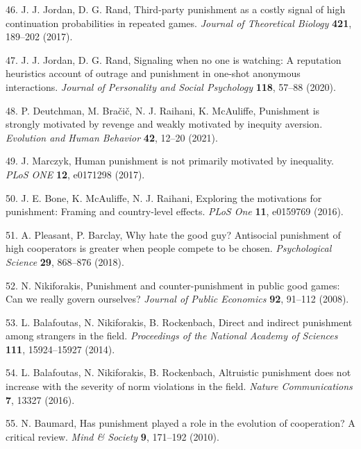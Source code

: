\documentclass[
  english,
  man, donotrepeattitle,floatsintext]{apa6}
\newenvironment{cslreferences}%
  {}%
  {\par}
\begin{document}
\begin{cslreferences}
\leavevmode\hypertarget{ref-Jordan2017}{}%
46. J. J. Jordan, D. G. Rand, Third-party punishment as a costly signal of high continuation probabilities in repeated games. \emph{Journal of Theoretical Biology} \textbf{421}, 189--202 (2017).

\leavevmode\hypertarget{ref-Jordan2020}{}%
47. J. J. Jordan, D. G. Rand, Signaling when no one is watching: A reputation heuristics account of outrage and punishment in one-shot anonymous interactions. \emph{Journal of Personality and Social Psychology} \textbf{118}, 57--88 (2020).

\leavevmode\hypertarget{ref-Deutchman2021}{}%
48. P. Deutchman, M. Bračič, N. J. Raihani, K. McAuliffe, Punishment is strongly motivated by revenge and weakly motivated by inequity aversion. \emph{Evolution and Human Behavior} \textbf{42}, 12--20 (2021).

\leavevmode\hypertarget{ref-Marczyk2017}{}%
49. J. Marczyk, Human punishment is not primarily motivated by inequality. \emph{PLoS ONE} \textbf{12}, e0171298 (2017).

\leavevmode\hypertarget{ref-Bone2016}{}%
50. J. E. Bone, K. McAuliffe, N. J. Raihani, Exploring the motivations for punishment: Framing and country-level effects. \emph{PLoS One} \textbf{11}, e0159769 (2016).

\leavevmode\hypertarget{ref-Pleasant2018}{}%
51. A. Pleasant, P. Barclay, Why hate the good guy? Antisocial punishment of high cooperators is greater when people compete to be chosen. \emph{Psychological Science} \textbf{29}, 868--876 (2018).

\leavevmode\hypertarget{ref-Nikiforakis2008b}{}%
52. N. Nikiforakis, Punishment and counter-punishment in public good games: Can we really govern ourselves? \emph{Journal of Public Economics} \textbf{92}, 91--112 (2008).

\leavevmode\hypertarget{ref-Balafoutas2014}{}%
53. L. Balafoutas, N. Nikiforakis, B. Rockenbach, Direct and indirect punishment among strangers in the field. \emph{Proceedings of the National Academy of Sciences} \textbf{111}, 15924--15927 (2014).

\leavevmode\hypertarget{ref-Balafoutas2016}{}%
54. L. Balafoutas, N. Nikiforakis, B. Rockenbach, Altruistic punishment does not increase with the severity of norm violations in the field. \emph{Nature Communications} \textbf{7}, 13327 (2016).

\leavevmode\hypertarget{ref-Baumard2010}{}%
55. N. Baumard, Has punishment played a role in the evolution of cooperation? A critical review. \emph{Mind \& Society} \textbf{9}, 171--192 (2010).


\end{cslreferences}
\end{document}
